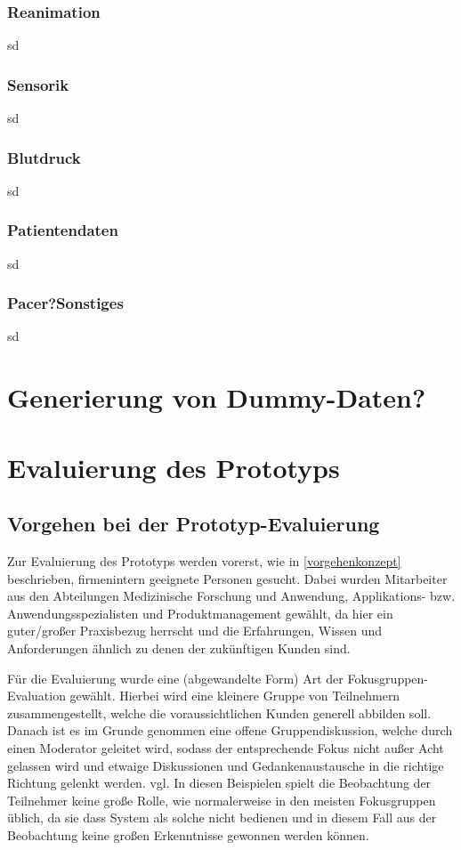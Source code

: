 \subsubsection{Reanimation}
sd
\subsubsection{Sensorik}
sd
\subsubsection{Blutdruck}
sd
\subsubsection{Patientendaten}
sd
\subsubsection{Pacer?Sonstiges}
sd


\section{Generierung von Dummy-Daten?}

\section{Evaluierung  des Prototyps}
\subsection{Vorgehen bei der Prototyp-Evaluierung}
Zur Evaluierung des Prototyps werden vorerst, wie in \ref{vorgehenkonzept} beschrieben, firmenintern geeignete Personen gesucht. 
Dabei wurden Mitarbeiter aus den Abteilungen Medizinische Forschung und Anwendung, Applikations- bzw. Anwendungsspezialisten und Produktmanagement gewählt, da hier ein guter/großer Praxisbezug herrscht und die Erfahrungen, Wissen und Anforderungen ähnlich zu denen der zukünftigen Kunden sind.

Für die Evaluierung wurde eine (abgewandelte Form) Art der Fokusgruppen-Evaluation gewählt. \cite{Christoforakos.2017} 
Hierbei wird eine kleinere Gruppe von Teilnehmern zusammengestellt, welche die voraussichtlichen Kunden generell abbilden soll. 
Danach ist es im Grunde genommen eine offene Gruppendiskussion, welche durch einen Moderator geleitet wird, sodass der entsprechende Fokus nicht außer Acht gelassen wird und etwaige Diskussionen und Gedankenaustausche in die richtige Richtung gelenkt werden. vgl. \cite{UsabilityinGermany.}
In diesen Beispielen spielt die Beobachtung der Teilnehmer keine große Rolle, wie normalerweise in den meisten Fokusgruppen üblich, da sie dass System als solche nicht bedienen und in diesem Fall aus der Beobachtung keine großen Erkenntnisse gewonnen werden können.


